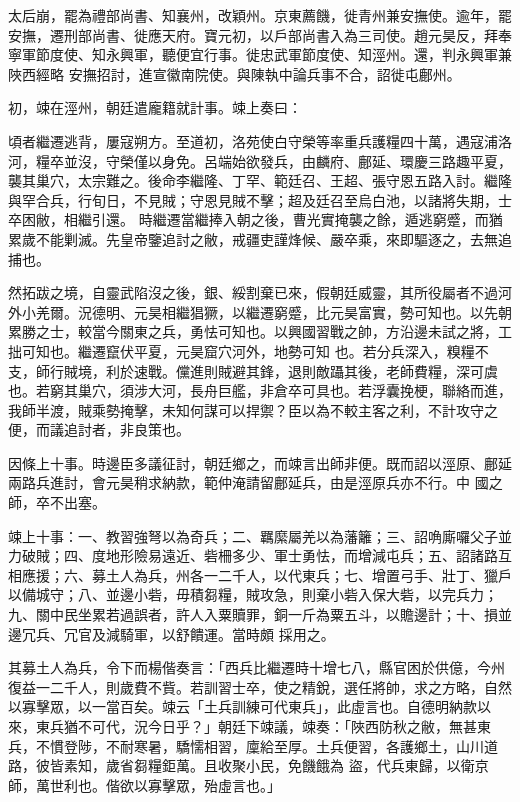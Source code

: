 \begin{pinyinscope}
 太后崩，罷為禮部尚書、知襄州，改穎州。京東薦饑，徙青州兼安撫使。逾年，罷安撫，遷刑部尚書、徙應天府。寶元初，以戶部尚書入為三司使。趙元昊反，拜奉寧軍節度使、知永興軍，聽便宜行事。徙忠武軍節度使、知涇州。還，判永興軍兼陜西經略
 安撫招討，進宣徽南院使。與陳執中論兵事不合，詔徙屯鄜州。



 初，竦在涇州，朝廷遣龐籍就計事。竦上奏曰：



 頃者繼遷逃背，屢寇朔方。至道初，洛苑使白守榮等率重兵護糧四十萬，遇寇浦洛河，糧卒並沒，守榮僅以身免。呂端始欲發兵，由麟府、鄜延、環慶三路趣平夏，襲其巢穴，太宗難之。後命李繼隆、丁罕、範廷召、王超、張守恩五路入討。繼隆與罕合兵，行旬日，不見賊；守恩見賊不擊；超及廷召至烏白池，以諸將失期，士卒困敝，相繼引還。
 時繼遷當繼捧入朝之後，曹光實掩襲之餘，遁逃窮蹙，而猶累歲不能剿滅。先皇帝鑒追討之敝，戒疆吏謹烽候、嚴卒乘，來即驅逐之，去無追捕也。



 然拓跋之境，自靈武陷沒之後，銀、綏割棄已來，假朝廷威靈，其所役屬者不過河外小羌爾。況德明、元昊相繼猖獗，以繼遷窮蹙，比元昊富實，勢可知也。以先朝累勝之士，較當今關東之兵，勇怯可知也。以興國習戰之帥，方沿邊未試之將，工拙可知也。繼遷竄伏平夏，元昊窟穴河外，地勢可知
 也。若分兵深入，糗糧不支，師行賊境，利於速戰。儻進則賊避其鋒，退則敵躡其後，老師費糧，深可虞也。若窮其巢穴，須涉大河，長舟巨艦，非倉卒可具也。若浮囊挽梗，聯絡而進，我師半渡，賊乘勢掩擊，未知何謀可以捍禦？臣以為不較主客之利，不計攻守之便，而議追討者，非良策也。



 因條上十事。時邊臣多議征討，朝廷鄉之，而竦言出師非便。既而詔以涇原、鄜延兩路兵進討，會元昊稍求納款，範仲淹請留鄜延兵，由是涇原兵亦不行。中
 國之師，卒不出塞。



 竦上十事：一、教習強弩以為奇兵；二、羈縻屬羌以為藩籬；三、詔唃廝囉父子並力破賊；四、度地形險易遠近、砦柵多少、軍士勇怯，而增減屯兵；五、詔諸路互相應援；六、募土人為兵，州各一二千人，以代東兵；七、增置弓手、壯丁、獵戶以備城守；八、並邊小砦，毋積芻糧，賊攻急，則棄小砦入保大砦，以完兵力；九、關中民坐累若過誤者，許人入粟贖罪，銅一斤為粟五斗，以贍邊計；十、損並邊冗兵、冗官及減騎軍，以舒饋運。當時頗
 採用之。



 其募土人為兵，令下而楊偕奏言：「西兵比繼遷時十增七八，縣官困於供億，今州復益一二千人，則歲費不貲。若訓習士卒，使之精銳，選任將帥，求之方略，自然以寡擊眾，以一當百矣。竦云「土兵訓練可代東兵」，此虛言也。自德明納款以來，東兵猶不可代，況今日乎？」朝廷下竦議，竦奏：「陜西防秋之敝，無甚東兵，不慣登陟，不耐寒暑，驕懦相習，廩給至厚。土兵便習，各護鄉土，山川道路，彼皆素知，歲省芻糧鉅萬。且收聚小民，免饑餓為
 盜，代兵東歸，以衛京師，萬世利也。偕欲以寡擊眾，殆虛言也。」




\end{pinyinscope}
